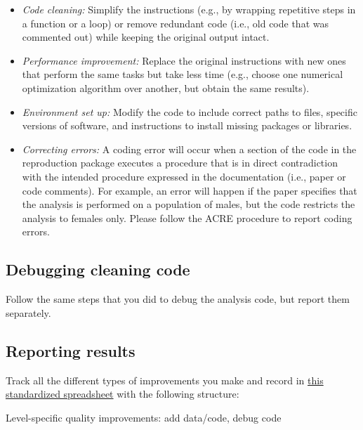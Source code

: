 \documentclass[]{book}
\providecommand{\tightlist}{%
  \setlength{\itemsep}{0pt}\setlength{\parskip}{0pt}}
\begin{document}
\begin{itemize}
\tightlist
\item
  \emph{Code cleaning:} Simplify the instructions (e.g., by wrapping repetitive steps in a function or a loop) or remove redundant code (i.e., old code that was commented out) while keeping the original output intact.\\
\item
  \emph{Performance improvement:} Replace the original instructions with new ones that perform the same tasks but take less time (e.g., choose one numerical optimization algorithm over another, but obtain the same results).\\
\item
  \emph{Environment set up:} Modify the code to include correct paths to files, specific versions of software, and instructions to install missing packages or libraries.\\
\item
  \emph{Correcting errors:} A coding error will occur when a section of the code in the reproduction package executes a procedure that is in direct contradiction with the intended procedure expressed in the documentation (i.e., paper or code comments). For example, an error will happen if the paper specifies that the analysis is performed on a population of males, but the code restricts the analysis to females only. Please follow the ACRE procedure to report coding errors.
\end{itemize}

\hypertarget{debugging-cleaning-code}{%
\subsection{Debugging cleaning code}\label{debugging-cleaning-code}}

Follow the same steps that you did to debug the analysis code, but report them separately.

\hypertarget{reporting-results}{%
\subsection{Reporting results}\label{reporting-results}}

Track all the different types of improvements you make and record in \href{https://docs.google.com/spreadsheets/d/1LUIdVFH0OfR70C7z07TYeE-uWzKI_JIeWUMaYhqEKK0/edit\#gid=0\&range=A3}{this standardized spreadsheet} with the following structure:

\label{tab:improvements-spreadsheet}Level-specific quality improvements: add data/code, debug code
\end{document}
